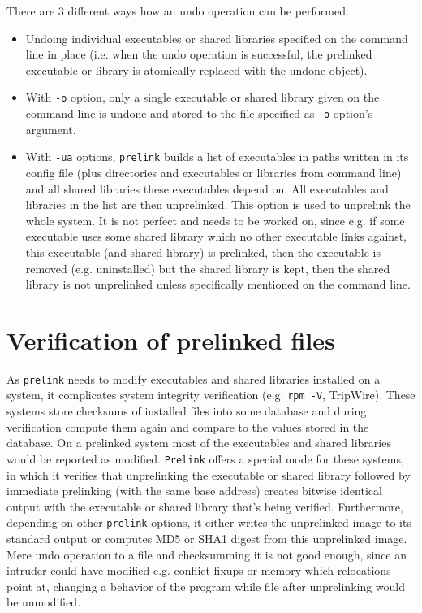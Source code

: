 \documentclass[twoside]{article}
\def\tts#1{\texttt{\small #1}}
\begin{document}
There are 3 different ways how an undo operation can be performed:
\begin{itemize}
\item Undoing individual executables or shared libraries specified on the
command line in place (i.e. when the undo operation is successful,
the prelinked executable or library is atomically replaced with the
undone object).
\item With \tts{-o} option, only a single executable or shared library
given on the command line is undone and stored to the file specified
as \tts{-o} option's argument.
\item With \tts{-ua} options, \tts{prelink} builds a list of executables
in paths written in its config file (plus directories and executables
or libraries from command line) and all shared libraries these executables
depend on.  All executables and libraries in the list are then unprelinked.
This option is used to unprelink the whole system.  It is not perfect
and needs to be worked on, since e.g. if some executable uses some shared
library which no other executable links against, this executable (and shared
library) is prelinked, then the executable is removed (e.g. uninstalled)
but the shared library is kept, then the shared library is not
unprelinked unless specifically mentioned on the command line.
\end{itemize}

\section{Verification of prelinked files}

As \tts{prelink} needs to modify executables and shared libraries installed
on a system, it complicates system integrity verification (e.g. \tts{rpm -V},
TripWire).  These systems store checksums of installed files into some
database and during verification compute them again and compare to the
values stored in the database.  On a prelinked system most of the executables
and shared libraries would be reported as modified.  \tts{Prelink} offers
a special mode for these systems, in which it verifies that unprelinking
the executable or shared library followed by immediate prelinking (with the
same base address) creates bitwise identical output with the executable
or shared library that's being verified.  Furthermore, depending on
other \tts{prelink} options, it either writes the unprelinked image
to its standard output or computes MD5 or SHA1 digest from this unprelinked
image.  Mere undo operation to a file and checksumming it is not good
enough, since an intruder could have modified e.g. conflict fixups or
memory which relocations point at, changing a behavior of the program
while file after unprelinking would be unmodified.
\end{document}
